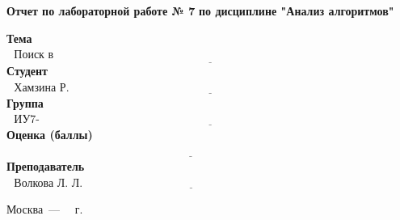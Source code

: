 \begin{titlepage}
	\begin{center}
  		\noindent\begin{minipage}{1.3\textwidth}\centering
  		\Large\textbf{   Отчет по лабораторной работе № 7}\newline
  		\textbf{по дисциплине "Анализ алгоритмов"}\newline\newline\newline
  		\end{minipage}
	\end{center}
	
	\noindent\textbf{Тема} $\underline{\text{~~Поиск в словаре~~~~~~~~~~~~~~~~~~~~~~~~~~~~~~~~~~~~~~~~~~~~~~~~~~~~~~~~~~~~~~~~~~~~~~~~~~~~~~~~~~~~~~~~~~}}$\newline\newline\newline
	\noindent\textbf{Студент} $\underline{\text{~~Хамзина Р. Р.~~~~~~~~~~~~~~~~~~~~~~~~~~~~~~~~~~~~~~~~~~~~~~~~~~~~~~~~~~~~~~~~~~~~~~~~~~~~~~~~~~~~~~~~~}}$\newline\newline
	\noindent\textbf{Группа} $\underline{\text{~~ИУ7-53Б~~~~~~~~~~~~~~~~~~~~~~~~~~~~~~~~~~~~~~~~~~~~~~~~~~~~~~~~~~~~~~~~~~~~~~~~~~~~~~~~~~~~~~~~~~~~~~~~~}}$\newline\newline
	\noindent\textbf{Оценка (баллы)} $\underline{\text{~~~~~~~~~~~~~~~~~~~~~~~~~~~~~~~~~~~~~~~~~~~~~~~~~~~~~~~~~~~~~~~~~~~~~~~~~~~~~~~~~~~~~~~~~~~~~~~~~~}}$\newline\newline
	\noindent\textbf{Преподаватель} $\underline{\text{~~Волкова Л. Л.~~~~~~~~~~~~~~~~~~~~~~~~~~~~~~~~~~~~~~~~~~~~~~~~~~~~~~~~~~~~~~~~~~~~~~~~~~~~~~}}$\newline
	
	\begin{center}
		\vfill
		Москва~---~\the\year
		~г.
	\end{center}
	\restoregeometry
\end{titlepage}

